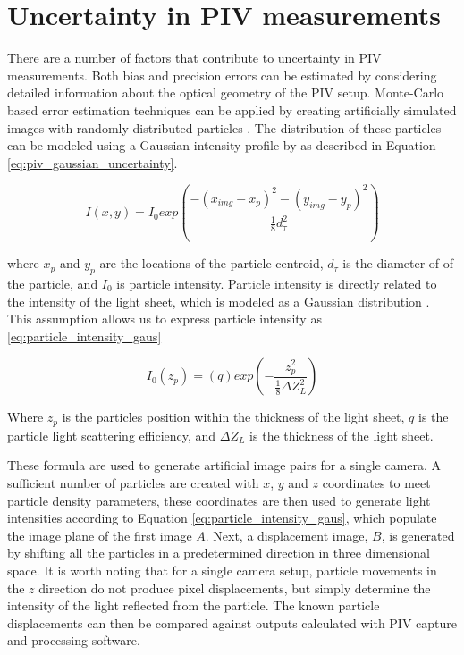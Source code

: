 \section{Uncertainty in PIV measurements}
\label{sec:piv_uncert}
 
There are a number of factors that contribute to uncertainty in PIV 
measurements. Both bias and precision errors can be estimated by considering 
detailed information about the optical geometry of the PIV setup. Monte-Carlo 
based error estimation techniques can be applied by creating artificially 
simulated images with randomly distributed particles \cite{adeyinka2005}. 
The distribution of these particles can be modeled using a Gaussian intensity  
profile by \cite{raffel1998} as described in Equation 
\ref{eq:piv_gaussian_uncertainty}.

\begin{equation}
	I(x,y) = I_0exp \left( \frac{-(x_{img} - x_p)^2 - (y_{img} - y_p)^2}
	{\frac{1}{8}d_\tau^2} \right)
	\label{eq:piv_gaussian_uncertainty}
\end{equation}

where $x_p$ and $y_p$ are the locations of the particle centroid, $d_\tau$ is 
the diameter of of the particle, and $I_0$ is particle intensity. Particle 
intensity is directly related to the intensity of the light sheet, which is 
modeled as a Gaussian distribution \cite{PIVuncertAIAA}. This assumption allows 
us 
to express particle intensity as \ref{eq:particle_intensity_gaus}

\begin{equation}
	I_0(z_p) = (q)exp\left(- \frac{z_p^2}{\frac{1}{8}\Delta Z_L^2}\right)
	\label{eq:particle_intensity_gaus}
\end{equation}

Where $z_p$ is the particles position within the thickness of the light sheet, 
$q$ is the particle light scattering efficiency, and $\Delta Z_L$ is the 
thickness of the light sheet.

These formula are used to generate artificial image pairs for a single camera. 
A sufficient number of particles are created with $x$, $y$ and $z$ coordinates 
to meet particle density parameters, these coordinates are then 
used to generate light intensities according to Equation 
\ref{eq:particle_intensity_gaus}, which populate the image plane of the first 
image $A$. Next, a displacement image, $B$, is generated by shifting all the 
particles in a predetermined direction in three dimensional space. It is worth 
noting that for a single camera setup, particle movements in the $z$ direction 
do not produce pixel displacements, but simply determine the intensity of the 
light reflected from the particle. The known particle displacements can then be 
compared against outputs calculated with PIV capture and processing software.

